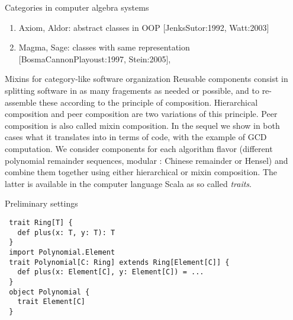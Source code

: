 \documentclass[final]{beamer}
\begin{document}
\begin{frame}[fragile]
\begin{columns}[t]
\begin{column}{.3\linewidth}
\begin{block}{\large Categories in computer algebra systems}
  \scriptsize
  \begin{enumerate}
  \item Axiom, Aldor: abstract classes in OOP
        [JenksSutor:1992, Watt:2003]
  \item Magma, Sage: classes with same representation
        [BosmaCannonPlayoust:1997, Stein:2005], 
  \end{enumerate}
  \end{block}
  \hfill
  \begin{block}{\large Mixins for category-like software organization}
\scriptsize %
Reusable components consist in splitting software in as many fragements
as needed or possible, and to re-assemble these according to the
principle of composition. Hierarchical composition and peer composition
are two variations of this principle. Peer composition is also called
mixin composition. In the sequel we show in both cases what it translates
into in terms of code, with the example of GCD computation. We consider
components for each algorithm flavor (different polynomial remainder
sequences, modular : Chinese remainder or Hensel) and combine them
together using either hierarchical or mixin composition. The latter
is available in the computer language Scala as so called {\em traits}.
  \end{block}
\hfill
  \begin{block}{\large Preliminary settings}
\tiny %
\begin{lstlisting}
 trait Ring[T] {
   def plus(x: T, y: T): T
 }
 import Polynomial.Element
 trait Polynomial[C: Ring] extends Ring[Element[C]] {
   def plus(x: Element[C], y: Element[C]) = ...
 }
 object Polynomial {
   trait Element[C]
 }
\end{lstlisting}
  \end{block}
\end{column}


\begin{column}{.3\linewidth}


\end{column}
\end{columns}
\end{frame}
\end{document}
